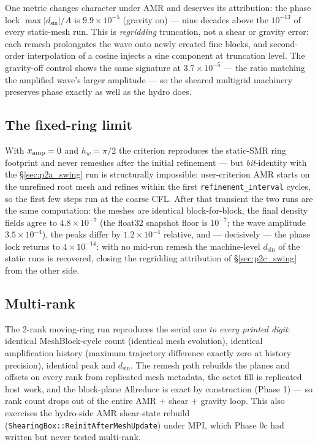 \documentclass[11pt]{article}
\newcommand{\code}[1]{\texttt{#1}}
\begin{document}
One metric changes character under AMR and deserves its attribution: the phase
lock $\max|d_{\sin}|/A$ is $9.9\times10^{-5}$ (gravity on) --- nine decades
above the $10^{-13}$ of every static-mesh run. This is \emph{regridding}
truncation, not a shear or gravity error: each remesh prolongates the wave onto
newly created fine blocks, and second-order interpolation of a cosine injects a
sine component at truncation level. The gravity-off control shows the same
signature at $3.7\times10^{-5}$ --- the ratio matching the amplified wave's
larger amplitude --- so the sheared multigrid machinery preserves phase exactly
as well as the hydro does.

\subsection{The fixed-ring limit}
\label{sec:p2c_fixed}
With $x_{\rm amp}=0$ and $h_w = \pi/2$ the criterion reproduces the static-SMR
ring footprint and never remeshes after the initial refinement --- but
\emph{bit}-identity with the \S\ref{sec:p2a_swing} run is structurally
impossible: user-criterion AMR starts on the unrefined root mesh and refines
within the first \code{refinement\_interval} cycles, so the first few steps run
at the coarse CFL. After that transient the two runs are the same computation:
the meshes are identical block-for-block, the final density fields agree to
$4.8\times10^{-7}$ (the float32 snapshot floor is $10^{-7}$; the wave amplitude
$3.5\times10^{-4}$), the peaks differ by $1.2\times10^{-4}$ relative, and ---
decisively --- the phase lock returns to $4\times10^{-14}$: with no mid-run
remesh the machine-level $d_{\sin}$ of the static runs is recovered, closing
the regridding attribution of \S\ref{sec:p2c_swing} from the other side.

\subsection{Multi-rank}
The 2-rank moving-ring run reproduces the serial one \emph{to every printed
digit}: identical MeshBlock-cycle count (identical mesh evolution), identical
amplification history (maximum trajectory difference exactly zero at history
precision), identical peak and $d_{\sin}$. The remesh path rebuilds the planes
and offsets on every rank from replicated mesh metadata, the octet fill is
replicated host work, and the block-plane Allreduce is exact by construction
(Phase 1) --- so rank count drops out of the entire AMR + shear + gravity loop.
This also exercises the hydro-side AMR shear-state rebuild
(\code{ShearingBox::ReinitAfterMeshUpdate}) under MPI, which Phase 0c had
written but never tested multi-rank.
\end{document}
